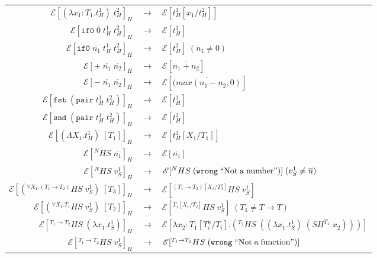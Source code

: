 \begin{figure}
\onehalfspacing
\begin{tabular}{rcl}
$\mathscr{E}[(\lambda x_{1}:T_{1}.t_{H}^{1})\;t_{H}^{2}]_{H}$ & $\rightarrow$ & $\mathscr{E}[t_{H}^{1}[x_{1}/t_{H}^{2}]]$ \\
$\mathscr{E}[\mathtt{if0}\;\overline{0}\;t_{H}^{1}\;t_{H}^{2}]_{H}$ & $\rightarrow$ & $\mathscr{E}[t_{H}^{1}]$ \\
$\mathscr{E}[\mathtt{if0}\;\overline{n_{1}}\;t_{H}^{1}\;t_{H}^{2}]_{H}$ & $\rightarrow$ & $\mathscr{E}[t_{H}^{2}]\;(n_{1}\neq0)$ \\
$\mathscr{E}[+\;\overline{n_{1}}\;\overline{n_{2}}]_{H}$ & $\rightarrow$ & $\mathscr{E}[\overline{n_{1}+n_{2}}]$ \\
$\mathscr{E}[-\;\overline{n_{1}}\;\overline{n_{2}}]_{H}$ & $\rightarrow$ & $\mathscr{E}[\overline{(max(n_{1}-n_{2},0)}]$ \\
$\mathscr{E}[\mathtt{fst}\;(\mathtt{pair}\;t_{H}^{1}\;t_{H}^{2})]_{H}$ & $\rightarrow$ & $\mathscr{E}[t_{H}^{1}]$ \\
$\mathscr{E}[\mathtt{snd}\;(\mathtt{pair}\;t_{H}^{1}\;t_{H}^{2})]_{H}$ & $\rightarrow$ & $\mathscr{E}[t_{H}^{2}]$ \\
$\mathscr{E}[(\Lambda X_{1}.t_{H}^{1})\;[T_{1}]]_{H}$ & $\rightarrow$ & $\mathscr{E}[t_{H}^{1}[X_{1}/T_{1}]]$ \\
$\mathscr{E}[^{N}HS\;\overline{n_{1}}]_{H}$ & $\rightarrow$ & $\mathscr{E}[\overline{n_{1}}]$ \\
$\mathscr{E}[^{N}HS\;v_{S}^{1}]_{H}$ & $\rightarrow$ & $\mathscr{E}[^{N}HS\;(\mathtt{wrong}\;\mathrm{``Not\;a\;number"})]\;(v_{S}^{1}\neq\overline{n})$ \\
$\mathscr{E}[(^{\forall X_{1}.(T_{1}\rightarrow T_{2})}HS\;v_{S}^{1})\;[T_{3}]]_{H}$ & $\rightarrow$ & $\mathscr{E}[^{(T_{1}\rightarrow T_{2})[X_{1}/T^{a}_{3}]}HS\;v_{S}^{1}]$ \\
$\mathscr{E}[(^{\forall X_{1}.T_{1}}HS\;v_{S}^{1})\;[T_{2}]]_{H}$ & $\rightarrow$ & $\mathscr{E}[^{T_{1}[X_{1}/T_{2}]}HS\;v_{S}^{1}]\;(T_{1}\neq T\rightarrow T)$ \\
$\mathscr{E}[^{T_{1}\rightarrow T_{2}}HS\;(\lambda x_{1}.t_{S}^{1})]_{H}$ & $\rightarrow$ & $\mathscr{E}[\lambda x_{2}:T_{1}[T^{a}_{i}/T_{i}].(^{T_{2}}HS\;((\lambda x_{1}.t_{S}^{1})\;(SH^{T_{1}}\;x_{2})))]$ \\
$\mathscr{E}[^{T_{1}\rightarrow T_{2}}HS\;v_{S}^{1}]_{H}$ & $\rightarrow$ & $\mathscr{E}[^{T_{1}\rightarrow T_{2}}HS\;(\mathtt{wrong}\;\mathrm{``Not\;a\;function"})]$ \\

\end{tabular}
\end{figure}
